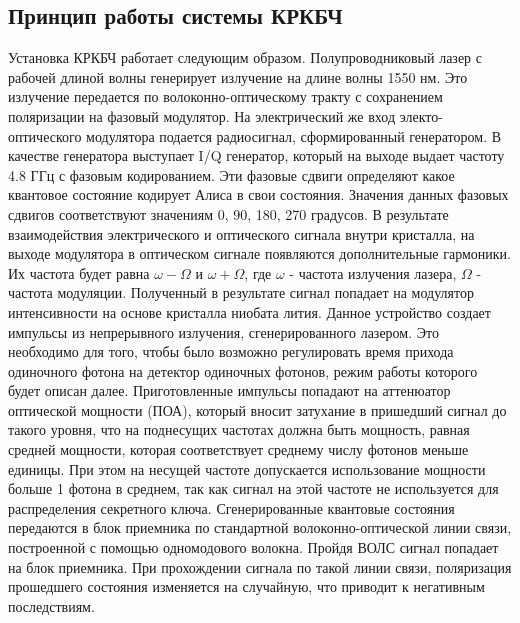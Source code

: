 \subsection*{Принцип работы системы КРКБЧ}
Установка КРКБЧ работает следующим образом. Полупроводниковый лазер с рабочей длиной волны генерирует излучение на длине волны 1550 нм. Это излучение передается по волоконно-оптическому тракту с сохранением поляризации на фазовый модулятор.
На электрический же вход электо-оптического модулятора подается радиосигнал, сформированный генератором. В качестве генератора выступает I/Q генератор, который на выходе выдает частоту 4.8 ГГц с фазовым кодированием.
Эти фазовые сдвиги определяют какое квантовое состояние кодирует Алиса в свои состояния. Значения данных фазовых сдвигов соответствуют значениям {0, 90, 180, 270} градусов. 
В результате взаимодействия электрического и оптического сигнала внутри кристалла, на выходе модулятора в оптическом сигнале появляются дополнительные гармоники. Их частота будет равна $\omega - \Omega$ и $\omega + \Omega$, где $\omega$ - частота излучения лазера, $\Omega$ - частота модуляции.
Полученный в результате сигнал попадает на модулятор интенсивности на основе кристалла ниобата лития. Данное устройство создает импульсы из непрерывного излучения, сгенерированного лазером. Это необходимо для того, чтобы было возможно регулировать время прихода одиночного фотона на детектор одиночных фотонов, режим работы которого будет описан далее.
Приготовленные импульсы попадают на аттенюатор оптической мощности (ПОА), который вносит затухание в пришедший сигнал до такого уровня, что на поднесущих частотах должна быть мощность, равная средней мощности, которая соответствует среднему числу фотонов меньше единицы.
При этом на несущей частоте допускается использование мощности больше 1 фотона в среднем, так как сигнал на этой частоте не используется для распределения секретного ключа.
Сгенерированные квантовые состояния передаются в блок приемника по стандартной волоконно-оптической линии связи, построенной с помощью одномодового волокна. 
Пройдя ВОЛС сигнал попадает на блок приемника. 
При прохождении сигнала по такой линии связи, поляризация прошедшего состояния изменяется на случайную, что приводит к негативным последствиям. 
